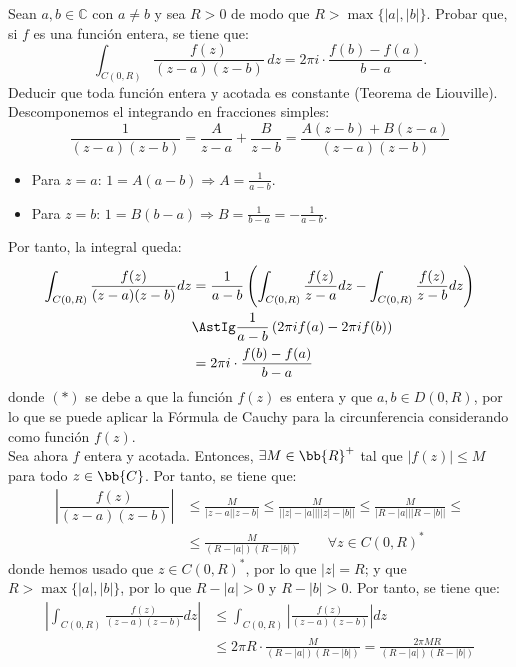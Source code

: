 \documentclass[12pt]{article}
\begin{document}
    \begin{ejercicio}[3 puntos]
        Sean $a, b \in \mathbb{C}$ con $a \neq b$ y sea $R > 0$ de modo que $R > \max\{ |a|, |b| \}$. Probar que, si $f$ es una función entera, se tiene que:
        \[
            \int_{C(0,R)} \frac{f(z)}{(z-a)(z-b)} \, dz = 2\pi i \cdot \frac{f(b) - f(a)}{b-a}.
        \]
        Deducir que toda función entera y acotada es constante (Teorema de Liouville).\\

        Descomponemos el integrando en fracciones simples:
    \begin{equation*}
        \frac{1}{(z-a)(z-b)} = \frac{A}{z-a} + \frac{B}{z-b} = \frac{A(z-b)+B(z-a)}{(z-a)(z-b)}
    \end{equation*}
    \begin{itemize}
        \item Para $z=a$: $1=A(a-b)\Longrightarrow A=\frac{1}{a-b}$.
        \item Para $z=b$: $1=B(b-a)\Longrightarrow B=\frac{1}{b-a}=-\frac{1}{a-b}$.
    \end{itemize}

    Por tanto, la integral queda:
    \begin{align*}
        \int_{C(0,R)} \frac{f(z)}{(z-a)(z-b)}dz &= \frac{1}{a-b}\left(\int_{C(0,R)} \frac{f(z)}{z-a}dz - \int_{C(0,R)} \frac{f(z)}{z-b}dz\right)\\
        &\AstIg \frac{1}{a-b}\left(2\pi i f(a) - 2\pi i f(b)\right)\\
        &= 2\pi i \cdot \frac{f(b)-f(a)}{b-a}
    \end{align*}
    donde $(\ast)$ se debe a que la función $f(z)$ es entera y que $a,b\in D(0,R)$, por lo que se puede aplicar la Fórmula de Cauchy para la circunferencia considerando como función $f(z)$.\\

    Sea ahora $f$ entera y acotada. Entonces, $\exists M\in \bb{R}^+$ tal que $|f(z)|\leq M$ para todo $z\in \bb{C}$. Por tanto, se tiene que:
    \begin{align*}
        \left|\dfrac{f(z)}{(z-a)(z-b)}\right| &\leq \frac{M}{|z-a||z-b|}
        \leq \frac{M}{\left||z| - |a|\right|\left||z| - |b|\right|}
        \leq \frac{M}{\left|R - |a|\right|\left|R - |b|\right|}
        \leq\\&\leq  \frac{M}{(R-|a|)(R-|b|)}\qquad \forall z\in C(0,R)^*
    \end{align*}
    donde hemos usado que $z\in C(0,R)^*$, por lo que $|z|=R$; y que $R>\max\{|a|,|b|\}$, por lo que $R-|a|>0$ y $R-|b|>0$. Por tanto, se tiene que:
    \begin{align*}
        \left|\int_{C(0,R)} \frac{f(z)}{(z-a)(z-b)}dz\right| &\leq \int_{C(0,R)} \left|\frac{f(z)}{(z-a)(z-b)}\right|dz\\
        &\leq 2\pi R \cdot \frac{M}{(R-|a|)(R-|b|)} = \frac{2\pi M R}{(R-|a|)(R-|b|)}
    \end{align*}


\end{ejercicio}
\end{document}
